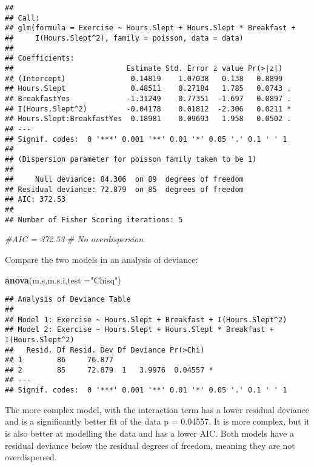 \documentclass[
]{article}
\newenvironment{Shaded}{\begin{snugshade}}{\end{snugshade}}
\newcommand{\AttributeTok}[1]{\textcolor[rgb]{0.13,0.29,0.53}{#1}}
\newcommand{\CommentTok}[1]{\textcolor[rgb]{0.56,0.35,0.01}{\textit{#1}}}
\newcommand{\FunctionTok}[1]{\textcolor[rgb]{0.13,0.29,0.53}{\textbf{#1}}}
\newcommand{\NormalTok}[1]{#1}
\newcommand{\StringTok}[1]{\textcolor[rgb]{0.31,0.60,0.02}{#1}}
\begin{document}
\begin{verbatim}
## 
## Call:
## glm(formula = Exercise ~ Hours.Slept + Hours.Slept * Breakfast + 
##     I(Hours.Slept^2), family = poisson, data = data)
## 
## Coefficients:
##                          Estimate Std. Error z value Pr(>|z|)  
## (Intercept)               0.14819    1.07038   0.138   0.8899  
## Hours.Slept               0.48511    0.27184   1.785   0.0743 .
## BreakfastYes             -1.31249    0.77351  -1.697   0.0897 .
## I(Hours.Slept^2)         -0.04178    0.01812  -2.306   0.0211 *
## Hours.Slept:BreakfastYes  0.18981    0.09693   1.958   0.0502 .
## ---
## Signif. codes:  0 '***' 0.001 '**' 0.01 '*' 0.05 '.' 0.1 ' ' 1
## 
## (Dispersion parameter for poisson family taken to be 1)
## 
##     Null deviance: 84.306  on 89  degrees of freedom
## Residual deviance: 72.879  on 85  degrees of freedom
## AIC: 372.53
## 
## Number of Fisher Scoring iterations: 5
\end{verbatim}

\begin{Shaded}
\begin{Highlighting}[]
\CommentTok{\#AIC = 372.53}
\CommentTok{\# No overdispersion}
\end{Highlighting}
\end{Shaded}

Compare the two models in an analysis of deviance:

\begin{Shaded}
\begin{Highlighting}[]
\FunctionTok{anova}\NormalTok{(m.s,m.s.i,}\AttributeTok{test =}\StringTok{"Chisq"}\NormalTok{)}
\end{Highlighting}
\end{Shaded}

\begin{verbatim}
## Analysis of Deviance Table
## 
## Model 1: Exercise ~ Hours.Slept + Breakfast + I(Hours.Slept^2)
## Model 2: Exercise ~ Hours.Slept + Hours.Slept * Breakfast + I(Hours.Slept^2)
##   Resid. Df Resid. Dev Df Deviance Pr(>Chi)  
## 1        86     76.877                       
## 2        85     72.879  1   3.9976  0.04557 *
## ---
## Signif. codes:  0 '***' 0.001 '**' 0.01 '*' 0.05 '.' 0.1 ' ' 1
\end{verbatim}

The more complex model, with the interaction term has a lower residual
deviance and is a significantly better fit of the data p = 0.04557. It
is more complex, but it is also better at modelling the data and has a
lower AIC. Both models have a residual deviance below the residual
degrees of freedom, meaning they are not overdispersed.
\end{document}
